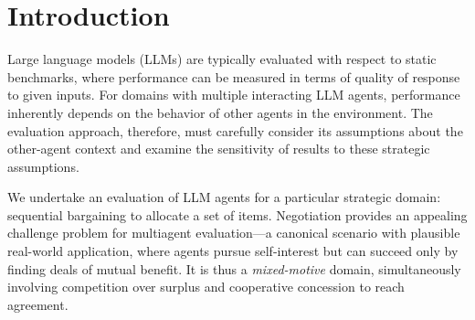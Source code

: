 \documentclass{article}
\theoremstyle{plain}
\theoremstyle{definition}
\theoremstyle{remark}
\begin{document}
\begin{abstract}
We conduct an empirical game-theoretic analysis of how large-language models negotiate the division of a set of subjectively valued items.
The LLM agents represent \textit{meta-strategies}, mapping a prompt describing the bargaining scenario to their implemented strategy for negotiation.
Analysis of gradations of prompts shows that incremental emphasis of game features can reduce blatant mistakes.
To evaluate their relative performance, we formulate and estimate an empirical \textit{meta-game} model over the LLM agents.
We identify equilibria in this game model, and analyze the agents' competitiveness and fairness in the equilibrium context according to measures of regret, welfare, and envy-freeness.
Uncertainty in these estimates is quantified using a statistical bootstrapping approach.
Across nine LLM variants plus RL and heuristic baselines, OpenAI models (especially o3-mini) deliver the best individual and social performance, as well as greatest robustness. 
Introducing a heuristic rigid bargaining strategy exposes systematic vulnerabilities in some LLM agents, underscoring the value of adversarial evaluation.  
\end{abstract}

\section{Introduction}

Large language models (LLMs) are typically evaluated with respect to static benchmarks, where performance can be measured in terms of quality of response to given inputs.
For domains with multiple interacting LLM agents, performance inherently depends on the behavior of other agents in the environment.
The evaluation approach, therefore, must carefully consider its assumptions about the other-agent context and examine the sensitivity of results to these strategic assumptions.

We undertake an evaluation of LLM agents for a particular strategic domain: sequential bargaining to allocate a set of items. 
Negotiation provides an appealing challenge problem for multiagent evaluation---a canonical scenario with plausible real-world application, where agents pursue self-interest but can succeed only by finding deals of mutual benefit.
It is thus a \textit{mixed-motive} domain, simultaneously involving competition over surplus and cooperative concession to reach agreement.
\end{document}
